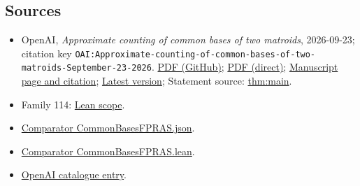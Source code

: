 \documentclass[11pt]{article}
\begin{document}
\subsection{Sources}
\begin{itemize}
\item OpenAI, \emph{Approximate counting of common bases of two matroids}, 2026-09-23; citation key \texttt{OAI:Approximate-counting-of-common-bases-of-two-matroids-September-23-2026}. \href{https://github.com/openai/math/blob/adc7f1241b42e322a6451854ab7e4b4c146bf78a/preprints/Approximate-counting-of-common-bases-of-two-matroids-September-23-2026/main.pdf}{PDF (GitHub)}; \href{https://github.com/openai/math/raw/adc7f1241b42e322a6451854ab7e4b4c146bf78a/preprints/Approximate-counting-of-common-bases-of-two-matroids-September-23-2026/main.pdf}{PDF (direct)}; \href{https://github.com/openai/math/blob/adc7f1241b42e322a6451854ab7e4b4c146bf78a/preprints/Approximate-counting-of-common-bases-of-two-matroids-September-23-2026/README.md}{Manuscript page and citation}; \href{https://github.com/openai/math/blob/main/preprints/Approximate-counting-of-common-bases-of-two-matroids-September-23-2026/main.pdf}{Latest version}; Statement source: \href{https://github.com/openai/math/blob/adc7f1241b42e322a6451854ab7e4b4c146bf78a/preprints/Approximate-counting-of-common-bases-of-two-matroids-September-23-2026/build/main.tex\#L86}{thm:main}.
\item Family 114: \href{https://github.com/openai/math/blob/adc7f1241b42e322a6451854ab7e4b4c146bf78a/lean/docs/114.md}{Lean scope}.
\item \href{https://github.com/openai/math/blob/adc7f1241b42e322a6451854ab7e4b4c146bf78a/lean/ComparatorChallenges/CommonBasesFPRAS.json}{Comparator CommonBasesFPRAS.json}.
\item \href{https://github.com/openai/math/blob/adc7f1241b42e322a6451854ab7e4b4c146bf78a/lean/ComparatorChallenges/CommonBasesFPRAS.lean}{Comparator CommonBasesFPRAS.lean}.
\item \href{https://github.com/openai/math/blob/adc7f1241b42e322a6451854ab7e4b4c146bf78a/CONTENTS.md}{OpenAI catalogue entry}.
\end{itemize}
\end{document}
